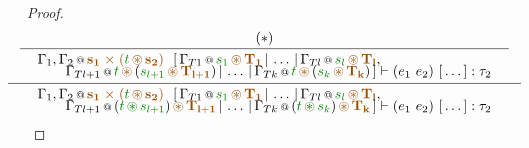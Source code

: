 \begin{proof}
\[
\hspace{-2em}
\inference 
 { \inference
   { (*) }
   { \begin{array}{l}
      \coctx{\Gamma_1, \Gamma_2}{\aclrd{\mathbf{s_1}\;\atimes\;(\cclrd{t} \,\aseq\, \aclrd{\mathbf{s_2}})}} ~~
       [\,\coctx{\Gamma_{T1}}{ \cclrd{s_1}\,\aseq\,\aclrd{\mathbf{T_1}} } \,|\, \ldots \,|\, 
          \coctx{\Gamma_{Tl}}{ \cclrd{s_l}\,\aseq\,\aclrd{\mathbf{T_l}} }, 
         \\[-0.35em] \qquad
         \coctx{\Gamma_{Tl+1}}{\cclrd{t} \,\aseq\, (\cclrd{s_{l+1}}\,\aseq\,\aclrd{\mathbf{T_{l+1}}}) } \,|\, \ldots \,|\,
         \coctx{\Gamma_{Tk}}{\cclrd{t} \,\aseq\, (\cclrd{s_k}\,\aseq\,\aclrd{\mathbf{T_k}})}\,] \vdash (e_1~e_2)~[\,\ldots\,] : \tau_2 
      \end{array} } }
 { \begin{array}{l}
    \coctx{\Gamma_1, \Gamma_2}{\aclrd{\mathbf{s_1}\;\atimes\;(\cclrd{t} \,\aseq\, \aclrd{\mathbf{s_2}})}} ~~
     [\,\coctx{\Gamma_{T1}}{ \cclrd{s_1}\,\aseq\,\aclrd{\mathbf{T_1}} } \,|\, \ldots \,|\, 
        \coctx{\Gamma_{Tl}}{ \cclrd{s_l}\,\aseq\,\aclrd{\mathbf{T_l}} }, 
       \\[-0.35em] \qquad
       \coctx{\Gamma_{Tl+1}}{(\cclrd{t} \,\cseq\, \cclrd{s_{l+1}})\,\aseq\,\aclrd{\mathbf{T_{l+1}}} } \,|\, \ldots \,|\,
       \coctx{\Gamma_{Tk}}{(\cclrd{t} \,\cseq\, \cclrd{s_k})\,\aseq\,\aclrd{\mathbf{T_k}}}\,] \vdash (e_1~e_2)~[\,\ldots\,] : \tau_2 
    \end{array} }
\]


\end{proof}
